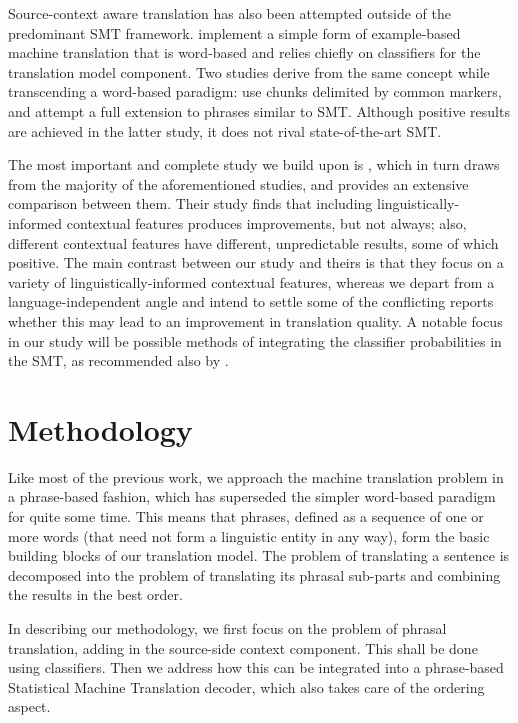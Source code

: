\documentclass[smallextended]{svjour3}       %
\theoremstyle{break}
\begin{document}
Source-context aware translation has also been attempted outside of the
predominant SMT framework. \cite{MBMT} implement a
simple form of example-based machine translation that is word-based and relies
chiefly on classifiers for the translation model component. Two studies derive
from the same concept while transcending a word-based paradigm:
\cite{MARKERBASED} use chunks delimited by common markers, and \cite{PBMBMT}
attempt a full extension to phrases similar to SMT. Although positive results
are achieved in the latter study, it does not rival state-of-the-art SMT.

The most important and complete study we build upon is
\cite{Rejwanul+11}, which in turn draws from the majority of the
aforementioned studies, and provides an extensive comparison between
them. Their study finds that including linguistically-informed
contextual features produces improvements, but not always; also,
different contextual features have different, unpredictable results,
some of which positive. The main contrast between our study and
theirs is that they focus on a variety of linguistically-informed
contextual features, whereas we depart from a language-independent
angle and intend to settle some of the conflicting reports whether
this may lead to an improvement in translation quality. A notable
focus in our study will be possible methods of integrating the
classifier probabilities in the SMT, as recommended also by
\cite{Gimenez+07}.


\section{Methodology}
\label{ref:methodology}

Like most of the previous work, we approach the machine translation
problem in a phrase-based fashion, which has superseded the simpler word-based
paradigm for quite some time. This means that phrases, defined as a
sequence of one or more words (that need not form a linguistic entity in any
way), form the basic building blocks of our translation model. The problem of
translating a sentence is decomposed into the problem of translating its phrasal
sub-parts and combining the results in the best order.

In describing our methodology, we first focus on the problem of phrasal
translation, adding in the source-side context component. This shall be done
using classifiers. Then we address how this can be integrated into a
phrase-based Statistical Machine Translation decoder, which also takes care of
the ordering aspect. 
\end{document}
